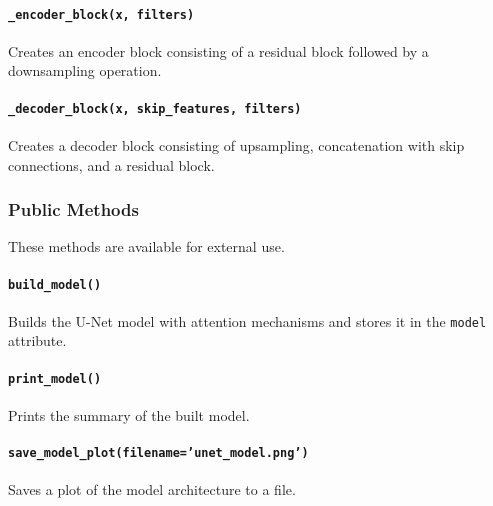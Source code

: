 \documentclass{article}
\begin{document}
\paragraph*{\texttt{\_encoder\_block(x, filters)}}
Creates an encoder block consisting of a residual block followed by a downsampling operation.

\paragraph*{\texttt{\_decoder\_block(x, skip\_features, filters)}}
Creates a decoder block consisting of upsampling, concatenation with skip connections, and a residual block.

\subsubsection*{Public Methods}
These methods are available for external use.

\paragraph*{\texttt{build\_model()}}
Builds the U-Net model with attention mechanisms and stores it in the \texttt{model} attribute.

\paragraph*{\texttt{print\_model()}}
Prints the summary of the built model.

\paragraph*{\texttt{save\_model\_plot(filename='unet\_model.png')}}
Saves a plot of the model architecture to a file.
\end{document}
